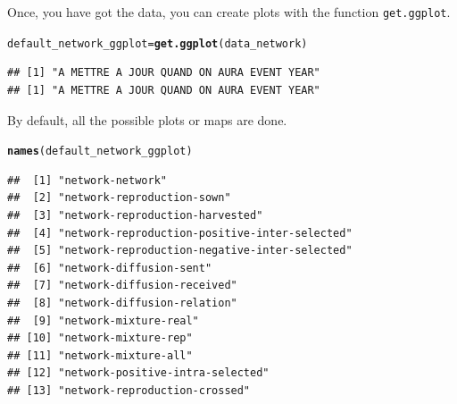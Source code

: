 \documentclass{article}\usepackage[]{graphicx}\usepackage[]{color}
\makeatletter
\newcommand{\hlstd}[1]{\textcolor[rgb]{0.345,0.345,0.345}{#1}}%
\newcommand{\hlkwb}[1]{\textcolor[rgb]{0.69,0.353,0.396}{#1}}%
\newcommand{\hlkwd}[1]{\textcolor[rgb]{0.737,0.353,0.396}{\textbf{#1}}}%
\newenvironment{kframe}{%
 \def\at@end@of@kframe{}%
 \ifinner\ifhmode%
  \def\at@end@of@kframe{\end{minipage}}%
  \begin{minipage}{\columnwidth}%
 \fi\fi%
 \def\FrameCommand##1{\hskip\@totalleftmargin \hskip-\fboxsep
 \colorbox{shadecolor}{##1}\hskip-\fboxsep
     \hskip-\linewidth \hskip-\@totalleftmargin \hskip\columnwidth}%
 \MakeFramed {\advance\hsize-\width
   \@totalleftmargin\z@ \linewidth\hsize
   \@setminipage}}%
 {\par\unskip\endMakeFramed%
 \at@end@of@kframe}
\newenvironment{knitrout}{}{} %
\makeatother
\begin{document}
Once, you have got the data, you can create plots with the function \texttt{get.ggplot}.

\begin{knitrout}
\color{fgcolor}\begin{kframe}
\begin{alltt}
\hlstd{default_network_ggplot} \hlkwb{=} \hlkwd{get.ggplot}\hlstd{(data_network)}
\end{alltt}


{\ttfamily\noindent\itshape{}}\begin{verbatim}
## [1] "A METTRE A JOUR QUAND ON AURA EVENT YEAR"
## [1] "A METTRE A JOUR QUAND ON AURA EVENT YEAR"
\end{verbatim}
\end{kframe}
\end{knitrout}

By default, all the possible plots or maps are done.

\begin{knitrout}
\color{fgcolor}\begin{kframe}
\begin{alltt}
\hlkwd{names}\hlstd{(default_network_ggplot)}
\end{alltt}
\begin{verbatim}
##  [1] "network-network"                             
##  [2] "network-reproduction-sown"                   
##  [3] "network-reproduction-harvested"              
##  [4] "network-reproduction-positive-inter-selected"
##  [5] "network-reproduction-negative-inter-selected"
##  [6] "network-diffusion-sent"                      
##  [7] "network-diffusion-received"                  
##  [8] "network-diffusion-relation"                  
##  [9] "network-mixture-real"                        
## [10] "network-mixture-rep"                         
## [11] "network-mixture-all"                         
## [12] "network-positive-intra-selected"             
## [13] "network-reproduction-crossed"
\end{verbatim}
\end{kframe}
\end{knitrout}
\end{document}
